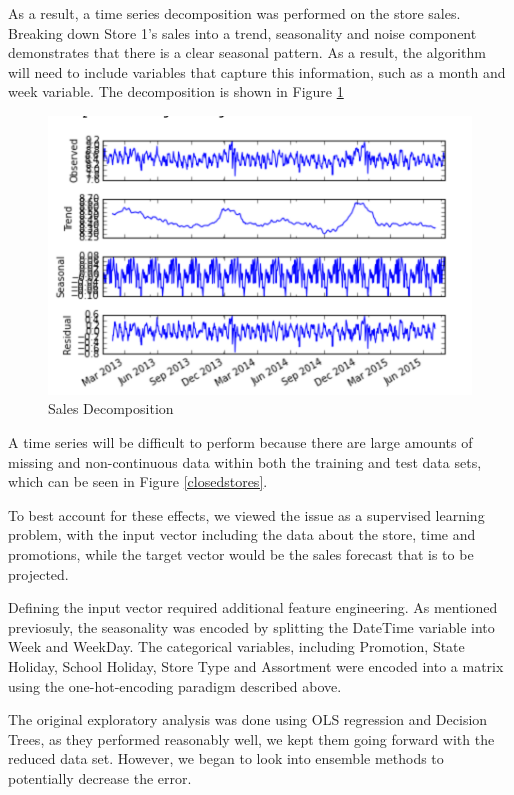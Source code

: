 \documentclass[DIV=calc, paper=a4, fontsize=11pt]{scrartcl}	 %
\begin{document}
As a result, a time series decomposition was performed on the store sales. Breaking down Store 1’s sales into a trend, seasonality and noise component demonstrates that there is a clear seasonal pattern. As a result, the algorithm will need to include variables that capture this information, such as a month and week variable. The decomposition is shown in Figure \ref{store1trend}

\begin{figure}[!htbp]
\centering
\caption{Sales Decomposition}
\label{store1trend}
\includegraphics[scale=0.75]{figures/store1trend.png}
\end{figure} 

A time series will be difficult to perform because there are large amounts of missing and non-continuous data within both the training and test data sets, which can be seen in Figure \ref{closedstores}.

To best account for these effects, we viewed the issue as a supervised learning problem, with the input vector including the data about the store, time and promotions, while the target vector would be the sales forecast that is to be projected. 

Defining the input vector required additional feature engineering. As mentioned previosuly, the seasonality was encoded by splitting the DateTime variable into Week and WeekDay. The categorical variables, including Promotion, State Holiday, School Holiday, Store Type and Assortment were encoded into a matrix using the one-hot-encoding paradigm described above.

The original exploratory analysis was done using OLS regression and Decision Trees, as they performed reasonably well, we kept them going forward with the reduced data set. However, we began to look into ensemble methods to potentially decrease the error. 
\end{document}
